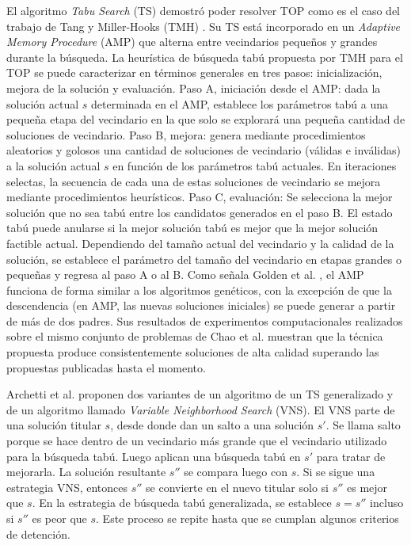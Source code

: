 \bigskip

El algoritmo \textit{Tabu Search} (TS) demostró poder resolver TOP como es el caso del trabajo de Tang y Miller-Hooks (TMH) \cite{TangMillerHooks}. Su TS está incorporado en un \textit{Adaptive Memory Procedure} (AMP) que alterna entre vecindarios pequeños y grandes durante la búsqueda. La heurística de búsqueda tabú propuesta por TMH para el TOP se puede caracterizar en términos generales en tres pasos: inicialización, mejora de la solución y evaluación. Paso A, iniciación desde el AMP: dada la solución actual $s$ determinada en el AMP, establece los parámetros tabú a una pequeña etapa del vecindario en la que solo se explorará una pequeña cantidad de soluciones de vecindario. Paso B, mejora: genera mediante procedimientos aleatorios y golosos una cantidad de soluciones de vecindario (válidas e inválidas) a la solución actual $s$ en función de los parámetros tabú actuales. En iteraciones selectas, la secuencia de cada una de estas soluciones de vecindario se mejora mediante procedimientos heurísticos. Paso C, evaluación: Se selecciona la mejor solución que no sea tabú entre los candidatos generados en el paso B. El estado tabú puede anularse si la mejor solución tabú es mejor que la mejor solución factible actual. Dependiendo del tamaño actual del vecindario y la calidad de la solución, se establece el parámetro del tamaño del vecindario en etapas grandes o pequeñas y regresa al paso A o al B. Como señala Golden et al. \cite{GoldenLaporteTaillard}, el AMP funciona de forma similar a los algoritmos genéticos, con la excepción de que la descendencia (en AMP, las nuevas soluciones iniciales) se puede generar a partir de más de dos padres. Sus resultados de experimentos computacionales realizados sobre el mismo conjunto de problemas de Chao et al. muestran que la técnica propuesta produce consistentemente soluciones de alta calidad superando las propuestas publicadas hasta el momento.

\bigskip

Archetti et al. \cite{ArchettiHertzSperanza} proponen dos variantes de un algoritmo de un TS generalizado y de un algoritmo llamado \textit{Variable Neighborhood Search} (VNS). El VNS parte de una solución titular $s$, desde donde dan un salto a una solución $s'$. Se llama salto porque se hace dentro de un vecindario más grande que el vecindario utilizado para la búsqueda tabú. Luego aplican una búsqueda tabú en $s'$ para tratar de mejorarla. La solución resultante $s''$ se compara luego con $s$. Si se sigue una estrategia VNS, entonces $s''$ se convierte en el nuevo titular solo si $s''$ es mejor que $s$. En la estrategia de búsqueda tabú generalizada, se establece $s = s''$ incluso si $s''$ es peor que $s$. Este proceso se repite hasta que se cumplan algunos criterios de detención.

